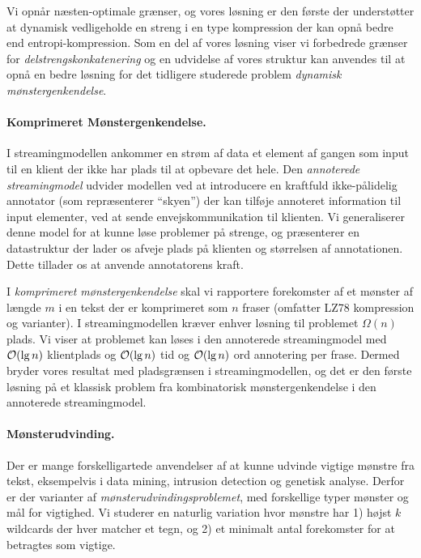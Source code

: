 Vi opnår næsten-optimale grænser, og vores løsning er den første der understøtter at dynamisk vedligeholde en streng i en type kompression der kan opnå bedre end entropi-kompression.
Som en del af vores løsning viser vi forbedrede grænser for \emph{delstrengskonkatenering} og en udvidelse af vores struktur kan anvendes til at opnå en bedre løsning for det tidligere studerede problem \emph{dynamisk mønstergenkendelse}.


\paragraph{Komprimeret Mønstergenkendelse.}
I streamingmodellen ankommer en strøm af data et element af gangen som input til en klient der ikke har plads til at opbevare det hele. 
Den \emph{annoterede streamingmodel} udvider modellen ved at introducere en kraftfuld ikke-pålidelig annotator (som repræsenterer ``skyen'') der kan tilføje annoteret information til input elementer, ved at sende envejskommunikation til klienten.
Vi generaliserer denne model for at kunne løse problemer på strenge, og præsenterer en datastruktur der lader os afveje plads på klienten og størrelsen af annotationen. Dette tillader os at anvende annotatorens kraft.

I \emph{komprimeret mønstergenkendelse} skal vi rapportere forekomster af et mønster af længde $m$ i en tekst der er komprimeret som $n$ fraser (omfatter LZ78 kompression og varianter). I streamingmodellen kræver enhver løsning til problemet $\Omega(n)$ plads.
Vi viser at problemet kan løses i den annoterede streamingmodel med $\mathcal{O}(\lg n)$ klientplads og $\mathcal{O}(\lg n)$ tid og $\mathcal{O}(\lg n)$ ord annotering per frase. Dermed bryder vores resultat med pladsgrænsen i streamingmodellen, og det er den første løsning på et klassisk problem fra kombinatorisk mønstergenkendelse i den annoterede streamingmodel.


\paragraph{Mønsterudvinding.}
Der er mange forskelligartede anvendelser af at kunne udvinde vigtige mønstre fra tekst, eksempelvis i data mining, intrusion detection og genetisk analyse. Derfor er der varianter af \emph{mønsterudvindingsproblemet}, med forskellige typer mønster og mål for vigtighed. Vi studerer en naturlig variation hvor mønstre har 1) højst $k$ wildcards der hver matcher et tegn, og 2) et minimalt antal forekomster for at betragtes som vigtige.

